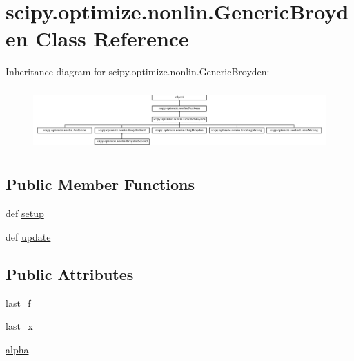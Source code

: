 \hypertarget{classscipy_1_1optimize_1_1nonlin_1_1GenericBroyden}{}\section{scipy.\+optimize.\+nonlin.\+Generic\+Broyden Class Reference}
\label{classscipy_1_1optimize_1_1nonlin_1_1GenericBroyden}
Inheritance diagram for scipy.\+optimize.\+nonlin.\+Generic\+Broyden\+:\begin{figure}[H]
\begin{center}
\leavevmode
\includegraphics[height=2.393162cm]{classscipy_1_1optimize_1_1nonlin_1_1GenericBroyden}
\end{center}
\end{figure}
\subsection*{Public Member Functions}
\begin{DoxyCompactItemize}
\item 
def \hyperlink{classscipy_1_1optimize_1_1nonlin_1_1GenericBroyden_a648b0ba3dee3e56c47fb91b47ca9b08f}{setup}
\item 
def \hyperlink{classscipy_1_1optimize_1_1nonlin_1_1GenericBroyden_a1da9365a88b909830821161eaaa12852}{update}
\end{DoxyCompactItemize}
\subsection*{Public Attributes}
\begin{DoxyCompactItemize}
\item 
\hyperlink{classscipy_1_1optimize_1_1nonlin_1_1GenericBroyden_a7f5af5ab68adb5f4b2279e5c010c9840}{last\+\_\+f}
\item 
\hyperlink{classscipy_1_1optimize_1_1nonlin_1_1GenericBroyden_a5dc8b892e6f2f6e6a15268df238523a1}{last\+\_\+x}
\item 
\hyperlink{classscipy_1_1optimize_1_1nonlin_1_1GenericBroyden_a9624177ee4561c1f8a87dd4ad57b4d06}{alpha}
\end{DoxyCompactItemize}


